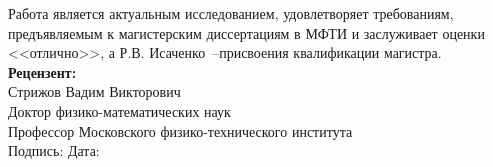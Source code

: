 \documentclass[12pt,oneside]{article}
\theoremstyle{definition}
\begin{document}
Работа является актуальным исследованием, удовлетворяет требованиям, предъявляемым к магистерским диссертациям в МФТИ и заслуживает оценки <<отлично>>, а Р.В. Исаченко~--присвоения квалификации магистра.
\\[4mm]
{\bf Рецензент:} \\
Стрижов Вадим Викторович \\
Доктор физико-математических наук \\
Профессор Московского физико-технического института \\[4mm]
Подпись: \hspace{7cm}Дата:
\end{document}
